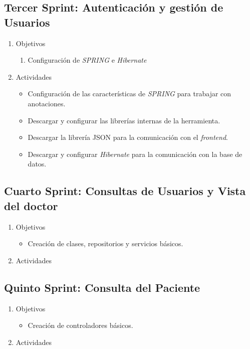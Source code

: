         
    \subsection{Tercer Sprint: Autenticación y gestión de Usuarios}
    \begin{enumerate}
        \item Objetivos
        \begin{enumerate}
            \item Configuración de \textit{SPRING} e \textit{Hibernate}
        \end{enumerate}
        \item Actividades
        \begin{itemize}
            \item Configuración de las características de \textit{SPRING} para trabajar con anotaciones.
            \item Descargar y configurar las librerías internas de la herramienta.
            \item Descargar la librería JSON para la comunicación con el \textit{frontend}.
            \item Descargar y configurar \textit{Hibernate} para la comunicación con la base de datos.
        \end{itemize}   
    \end{enumerate}
             
        
    \subsection{Cuarto Sprint: Consultas de Usuarios y Vista del doctor}
    \begin{enumerate}
        \item Objetivos
        \begin{itemize}
            \item Creación de clases, repositorios y servicios básicos.
        \end{itemize}
        \item Actividades
    \end{enumerate}
        
        
    \subsection{Quinto Sprint: Consulta del Paciente}
    \begin{enumerate}
        \item Objetivos
        \begin{itemize}
            \item Creación de controladores básicos.
        \end{itemize}
        \item Actividades
    \end{enumerate}
        
